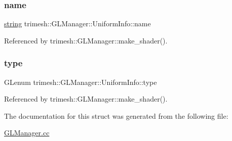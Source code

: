 \subsubsection{\texorpdfstring{name}{name}}
{\footnotesize\ttfamily \hyperlink{namespacetrimesh_a51b4a31323874089623d4b17afabc1aa}{string} trimesh\+::\+G\+L\+Manager\+::\+Uniform\+Info\+::name}



Referenced by trimesh\+::\+G\+L\+Manager\+::make\+\_\+shader().

\mbox{\label{structtrimesh_1_1GLManager_1_1UniformInfo_a9886509cdeb491200b6c44755677406f}} 
\subsubsection{\texorpdfstring{type}{type}}
{\footnotesize\ttfamily G\+Lenum trimesh\+::\+G\+L\+Manager\+::\+Uniform\+Info\+::type}



Referenced by trimesh\+::\+G\+L\+Manager\+::make\+\_\+shader().



The documentation for this struct was generated from the following file\+:\begin{DoxyCompactItemize}
\item 
\hyperlink{GLManager_8cc}{G\+L\+Manager.\+cc}\end{DoxyCompactItemize}
